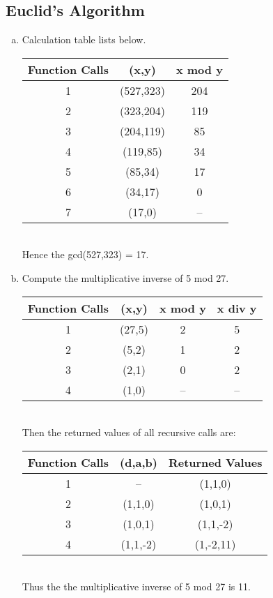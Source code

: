 \documentclass{article}
\begin{document}
\begin{enumerate}[(a).]
\part*{Euclid's Algorithm}
\begin{enumerate}[(a).]
    \item Calculation table lists below.\\
    \begin{tabular}{|c|c|c|}
    \hline
    Function Calls&(x,y)&x mod y\\
    \hline
    1&(527,323)&204\\
    \hline
    2&(323,204)&119\\
    \hline
    3&(204,119)&85\\
    \hline
    4&(119,85)&34\\
    \hline
    5&(85,34)&17\\
    \hline
    6&(34,17)&0\\
    \hline
    7&(17,0)&--\\
    \hline
    \end{tabular}
    \\
    Hence the gcd(527,323) = 17.

    \item Compute the multiplicative inverse of 5 mod 27.\\
    \begin{tabular}{|c|c|c|c|}
        \hline
        Function Calls&(x,y)&x mod y&x div y\\
        \hline
        1&(27,5)&2&5\\
        \hline
        2&(5,2)&1&2\\
        \hline
        3&(2,1)&0&2\\
        \hline
        4&(1,0)&--&--\\
        \hline
    \end{tabular}
    \\
    Then the returned values of all recursive calls are:\\
    \begin{tabular}{|c|c|c|}
        \hline
        Function Calls&(d,a,b)&Returned Values\\
        \hline
        1&--&(1,1,0)\\
        \hline
        2&(1,1,0)&(1,0,1)\\
        \hline
        3&(1,0,1)&(1,1,-2)\\
        \hline
        4&(1,1,-2)&(1,-2,11)\\
        \hline
    \end{tabular}
    \\
    Thus the the multiplicative inverse of 5 mod 27 is 11.


\end{enumerate}
\end{enumerate}
\end{document}
